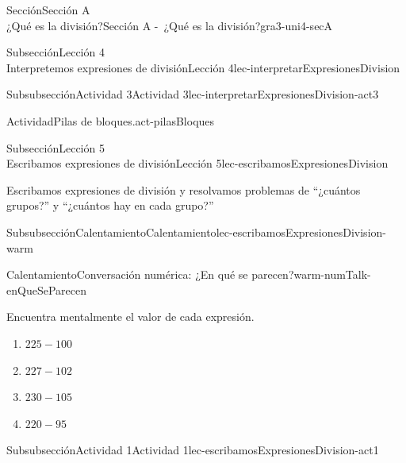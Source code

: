 \begin{sectionptx}{Sección}{{\Large Sección A\\}¿Qué es la división?}{}{Sección A -~¿Qué es la división?}{}{}{gra3-uni4-secA}
\begin{subsectionptx}{Subsección}{{\normalsize Lección 4\\[-0.05cm]}Interpretemos expresiones de división}{}{Lección 4}{}{}{lec-interpretarExpresionesDivision}
\begin{subsubsectionptx}{Subsubsección}{Actividad 3}{}{Actividad 3}{}{}{lec-interpretarExpresionesDivision-act3}
\begin{activity}{Actividad}{Pilas de bloques.}{act-pilasBloques}
\end{activity}%
\end{subsubsectionptx}
\end{subsectionptx}
%
%
\typeout{************************************************}
\typeout{************************************************}
%
\begin{subsectionptx}{Subsección}{{\normalsize Lección 5\\[-0.05cm]}Escribamos expresiones de división}{}{Lección 5}{}{}{lec-escribamosExpresionesDivision}
\begin{introduction}{}%
Escribamos expresiones de división y resolvamos problemas de “¿cuántos grupos?” y “¿cuántos hay en cada grupo?”%
\end{introduction}%
%
%
\typeout{************************************************}
\typeout{************************************************}
%
\begin{subsubsectionptx}{Subsubsección}{Calentamiento}{}{Calentamiento}{}{}{lec-escribamosExpresionesDivision-warm}
\nobreak
\begin{exploration}{Calentamiento}{Conversación numérica: ¿En qué se parecen?}{warm-numTalk-enQueSeParecen}%
\begin{sidebyside}{2}{0}{0.0}{0.2}%
\begin{sbspanel}{0.4}%
Encuentra mentalmente el valor de cada expresión.%
\end{sbspanel}%
\begin{sbspanel}{0.3}%
%
\vspace{-1ex}
\begin{enumerate}[label={\Alph*.}]
\item{}\(\displaystyle 225 - 100\)%
\item{}\(\displaystyle 227 - 102\)%
\item{}\(\displaystyle 230 - 105\)%
\item{}\(\displaystyle 220 - 95\)%
\end{enumerate}
\vspace{-0.5ex}
%
\end{sbspanel}%
\end{sidebyside}
\end{exploration}%
\end{subsubsectionptx}
%
%
\typeout{************************************************}
\typeout{************************************************}
%
\begin{subsubsectionptx}{Subsubsección}{Actividad 1}{}{Actividad 1}{}{}{lec-escribamosExpresionesDivision-act1}

\end{subsubsectionptx}
\end{subsectionptx}
\end{sectionptx}
